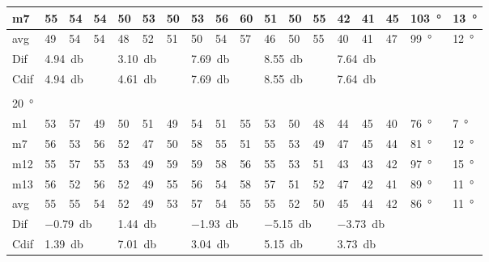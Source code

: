 \begin{table}[H]
\begin{tabular}{l|l|l|l|l|l|l|l|l|l|l|l|l|l|l|l|l|l}
m7    & 55     & 54     &  54    &   50   &   53   &  50    &  53    &  56     &  60    &  51     & 50     & 55     & 42 & 41 & 45   & \SI{103}{\degree} & \SI{13}{\degree}  \\ \hline
avg &  49    &  54    & 54     &  48    &  52    & 51     & 50     &   54    &   57   &  46     & 50     &  55    & 40 & 41  & 47    & \SI{99}{\degree} & \SI{12}{\degree}  \\ \hline  
Dif & \multicolumn{3}{l|}{\SI{4.94}{\decibel}} & \multicolumn{3}{l|}{\SI{3.10}{\decibel}} & \multicolumn{3}{l|}{\SI{7.69}{\decibel}} & \multicolumn{3}{l|}{\SI{8.55}{\decibel}} &  \multicolumn{3}{l|}{\SI{7.64}{\decibel}} & \multicolumn{2}{l}{} \\ \hline 
Cdif & \multicolumn{3}{l|}{\SI{4.94}{\decibel}} & \multicolumn{3}{l|}{\SI{4.61}{\decibel}} & \multicolumn{3}{l|}{\SI{7.69}{\decibel}} & \multicolumn{3}{l|}{\SI{8.55}{\decibel}} & \multicolumn{3}{l|}{\SI{7.64}{\decibel}}  &   \multicolumn{2}{l}{}   \\ 
 \multicolumn{18}{l}{ } \\                             
\SI{20}{\degree}   & \multicolumn{3}{l|}{} & \multicolumn{3}{l|}{} & \multicolumn{3}{l|}{} & \multicolumn{3}{l|}{} &  \multicolumn{3}{l|}{}   & \multicolumn{2}{l}{} \\  \hline
m1    &53      &  57    &  49    &   50   &  51    &  49    &  54    &   51    &  55    &    53   &  50    &  48    & 44 & 45 &40   & \SI{76}{\degree} & \SI{7}{\degree}   \\
m7    & 56     &  53    &  56    &   52   &  47    &   50   &   58   &   55    &  51    &    55   & 53     &  49    & 47 & 45 &44   & \SI{81}{\degree} & \SI{12}{\degree}   \\
m12  & 55     &  57    &  55    &  53    &  49    &   59   &   59   &   58    &   56   &   55    &  53    & 51     & 43 & 43 & 42   & \SI{97}{\degree} & \SI{15}{\degree}  \\
m13  &  56    &  52    &  56    &  52    &  49    &   55   &   56   &   54    &  58    &   57    &  51    &  52    & 47 & 42 & 41   & \SI{89}{\degree} & \SI{11}{\degree}  \\ \hline
avg &  55    & 55     &   54   &  52    & 49     &  53    &  57    &  54     &  55    &  55     &   52   & 50     & 45 & 44  &42   & \SI{86}{\degree} & \SI{11}{\degree}   \\ \hline  
Dif & \multicolumn{3}{l|}{\SI{-0.79}{\decibel}} & \multicolumn{3}{l|}{\SI{1.44}{\decibel}} & \multicolumn{3}{l|}{\SI{-1.93}{\decibel}} & \multicolumn{3}{l|}{\SI{-5.15}{\decibel}} &  \multicolumn{3}{l|}{\SI{-3.73}{\decibel}}      & \multicolumn{2}{l}{}   \\  \hline 
Cdif & \multicolumn{3}{l|}{\SI{1.39}{\decibel}} & \multicolumn{3}{l|}{\SI{7.01}{\decibel}} & \multicolumn{3}{l|}{\SI{3.04}{\decibel}} & \multicolumn{3}{l|}{\SI{5.15}{\decibel}} & \multicolumn{3}{l|}{\SI{3.73}{\decibel}}  &   \multicolumn{2}{l}{}   \\              
\end{tabular}
\label{meas:result_cross_9_10}
\end{table}

